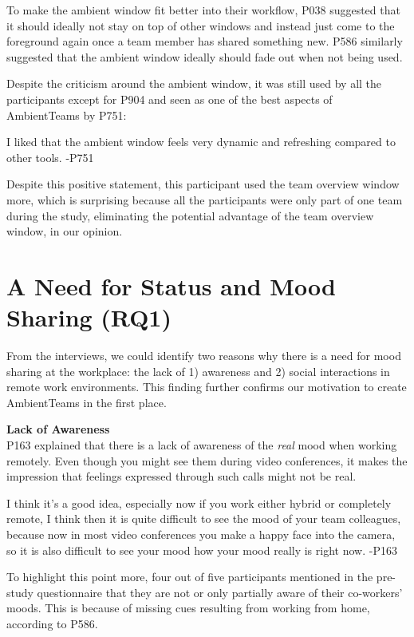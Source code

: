 To make the ambient window fit better into their workflow, P038 suggested that it should ideally not stay on top of other windows and instead just come to the foreground again once a team member has shared something new. P586 similarly suggested that the ambient window ideally should fade out when not being used.

Despite the criticism around the ambient window, it was still used by all the participants except for P904 and seen as one of the best aspects of AmbientTeams by P751:

\begin{displayquote}
    I liked that the ambient window feels very dynamic and refreshing compared to other tools. -P751
\end{displayquote}

Despite this positive statement, this participant used the team overview window more, which is surprising because all the participants were only part of one team during the study, eliminating the potential advantage of the team overview window, in our opinion.

\section{A Need for Status and Mood Sharing (RQ1)}
From the interviews, we could identify two reasons why there is a need for mood sharing at the workplace: the lack of 1) awareness and 2) social interactions in remote work environments. This finding further confirms our motivation to create AmbientTeams in the first place.

\medskip\noindent\textbf{Lack of Awareness} \\
P163 explained that there is a lack of awareness of the \textit{real} mood when working remotely. Even though you might see them during video conferences, it makes the impression that feelings expressed through such calls might not be real.

\begin{displayquote}
    I think it's a good idea, especially now if you work either hybrid or completely remote, I think then it is quite difficult to see the mood of your team colleagues, because now in most video conferences you make a happy face into the camera, so it is also difficult to see your mood how your mood really is right now. -P163
\end{displayquote}

To highlight this point more, four out of five participants mentioned in the pre-study questionnaire that they are not or only partially aware of their co-workers' moods. This is because of missing cues resulting from working from home, according to P586.

